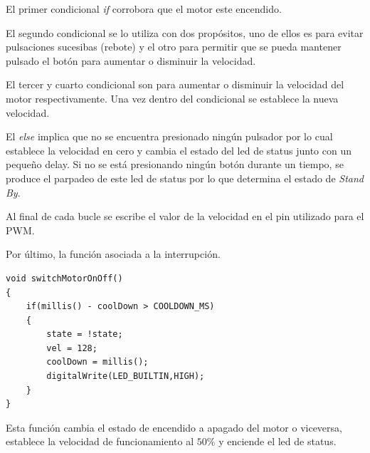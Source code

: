 \documentclass[a4paper, 12pt]{article}
\begin{document}
El primer condicional \textit{if} corrobora que el motor este encendido.

El segundo condicional se lo utiliza con dos propósitos, uno de ellos es para evitar pulsaciones sucesibas (rebote) y el otro para permitir que se pueda mantener pulsado el botón para aumentar o disminuir la velocidad.

El tercer y cuarto condicional son para aumentar o disminuir la velocidad del motor respectivamente. Una vez dentro del condicional se establece la nueva velocidad.

El \textit{else} implica que no se encuentra presionado ningún pulsador por lo cual establece la velocidad en cero y cambia el estado del led de status junto con un pequeño delay. Si no se está presionando ningún botón durante un tiempo, se produce el parpadeo de este led de status por lo que determina el estado de \textit{Stand By}.

Al final de cada bucle se escribe el valor de la velocidad en el pin utilizado para el PWM.

Por último, la función asociada a la interrupción.

\begin{lstlisting}
void switchMotorOnOff()
{
    if(millis() - coolDown > COOLDOWN_MS)
    {
        state = !state;
        vel = 128;
        coolDown = millis();
        digitalWrite(LED_BUILTIN,HIGH);
    }
}
\end{lstlisting}

Esta función cambia el estado de encendido a apagado del motor o viceversa, establece la velocidad de funcionamiento al $50\%$ y enciende el led de status.
\end{document}
